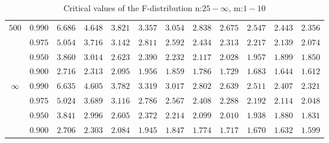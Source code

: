 \documentclass[11pt]{article}
\theoremstyle{definition}
\begin{document}
\begin{table}[H]
\begin{tabularx}{\linewidth}{c | c | c c c c c c c c c c}
		$500$ & $0.990$ & $6.686$ & $4.648$ & $3.821$ & $3.357$ & $3.054$ & $2.838$ & $2.675$ & $2.547$ & $2.443$ & $2.356$ \\
		& $0.975$ & $5.054$ & $3.716$ & $3.142$ & $2.811$ & $2.592$ & $2.434$ & $2.313$ & $2.217$ & $2.139$ & $2.074$ \\
		& $0.950$ & $3.860$ & $3.014$ & $2.623$ & $2.390$ & $2.232$ & $2.117$ & $2.028$ & $1.957$ & $1.899$ & $1.850$ \\
		& $0.900$ & $2.716$ & $2.313$ & $2.095$ & $1.956$ & $1.859$ & $1.786$ & $1.729$ & $1.683$ & $1.644$ & $1.612$ \\
		$\infty$ & $0.990$ & $6.635$ & $4.605$ & $3.782$ & $3.319$ & $3.017$ & $2.802$ & $2.639$ & $2.511$ & $2.407$ & $2.321$ \\
		& $0.975$ & $5.024$ & $3.689$ & $3.116$ & $2.786$ & $2.567$ & $2.408$ & $2.288$ & $2.192$ & $2.114$ & $2.048$ \\
		& $0.950$ & $3.841$ & $2.996$ & $2.605$ & $2.372$ & $2.214$ & $2.099$ & $2.010$ & $1.938$ & $1.880$ & $1.831$ \\
		& $0.900$ & $2.706$ & $2.303$ & $2.084$ & $1.945$ & $1.847$ & $1.774$ & $1.717$ & $1.670$ & $1.632$ & $1.599$
	\end{tabularx}
	\caption{Critical values of the F-distribution n:$25-\infty$, m:$1-10$}
\end{table}
\end{document}
